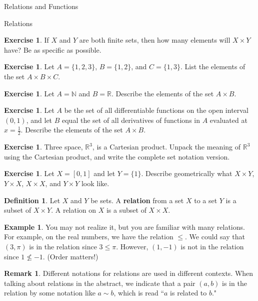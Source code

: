 \documentclass[11pt]{article}
\theoremstyle{definition}
\newtheorem{definition}[theorem]{Definition}
\newtheorem{example}[theorem]{Example}
\newtheorem{exercise}[theorem]{Exercise}
\newtheorem{remark}[theorem]{Remark}
\begin{document}
\begin{section}{Relations and Functions}
\begin{subsection}{Relations}
\begin{exercise}
If $X$ and $Y$ are both finite sets, then how many elements will $X\times Y$ have?  Be as specific as possible.
\end{exercise}

\begin{exercise} 
Let $A=\{1, 2, 3\}$, $B=\{1,2\}$, and $C=\{1,3\}$. List the elements of the set $A \times B\times C$. 
\end{exercise}

\begin{exercise}
Let $A=\mathbb{N}$ and $B=\mathbb{R}$. Describe the elements of the set $A \times B$. 
\end{exercise}

\begin{exercise} Let $A$ be the set of all differentiable functions on the open interval $(0,1)$, and let $B$ equal the set of all derivatives of functions in $A$ evaluated at $x=\frac{1}{2}$. Describe the elements of the set $A \times B$. \end{exercise}

\begin{exercise}
Three space, $\mathbb{R}^{3}$, is a Cartesian product.  Unpack the meaning of $\mathbb{R}^{3}$ using the Cartesian product, and write the complete set notation version.
\end{exercise}

\begin{exercise}
Let $X=[0,1]$ and let $Y=\{1\}$.  Describe geometrically what $X\times Y$, $Y\times X$, $X\times X$, and $Y\times Y$ look like.
\end{exercise}

\begin{definition}
Let $X$ and $Y$ be sets. A \textbf{relation} from a set $X$ to a set $Y$ is a subset of $X \times Y$. A relation on $X$ is a subset of $X \times X$.  
\end{definition}

\begin{example}
You may not realize it, but you are familiar with many relations.  For example, on the real numbers, we have the relation $\leq$.  We could say that $(3,\pi)$ is in the relation since $3\leq \pi$.  However, $(1,-1)$ is not in the relation since $1\nleq -1$.  (Order matters!)
\end{example}

\begin{remark}
Different notations for relations are used in different contexts.  When talking about relations in the abstract, we indicate that a pair $(a,b)$ is in the relation by some notation like $a\sim b$, which is read ``$a$ is related to $b$."
\end{remark}


\end{subsection}
\end{section}
\end{document}
